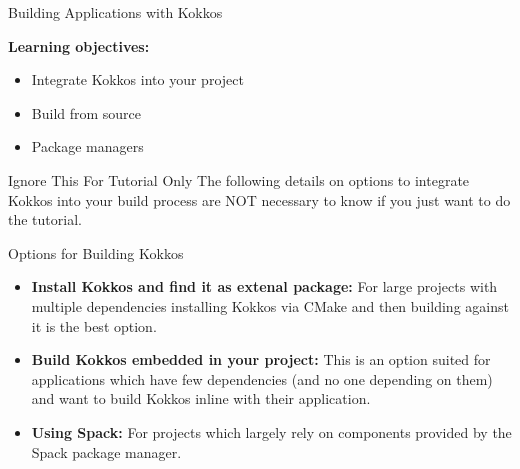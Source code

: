 



\begin{frame}[fragile]


  \vspace{10pt}
  {\Huge Building Applications with Kokkos}

  \vspace{10pt}

  \textbf{Learning objectives:}
  \begin{itemize}
    \item{Integrate Kokkos into your project}
    \item{Build from source}
    \item{Package managers}
  \end{itemize}

  \pause

  \begin{block}{Ignore This For Tutorial Only}
     The following details on options to integrate Kokkos into your build process are NOT necessary to know if you just want to do the tutorial.
  \end{block}

\end{frame}

\begin{frame}[fragile]{Options for Building Kokkos}

\begin{itemize}
\item \textbf{Install Kokkos and find it as extenal package:} For large projects with multiple dependencies installing Kokkos via CMake and then building against it is the best option.
\item \textbf{Build Kokkos embedded in your project:} This is an option suited for applications which have few dependencies (and no one depending on them) and want to build Kokkos inline with their application.
\item \textbf{Using Spack:} For projects which largely rely on components provided by the Spack package manager.
\end{itemize}
\end{frame}


